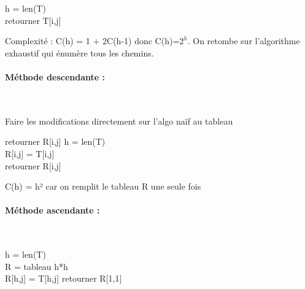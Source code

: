 \begin{algorithm}[H]
	
	h = len(T) \\
	 {
		retourner T[i,j]
	}
	
	\caption{cheminOpt(T, i, j)}
\end{algorithm}

\begin{rem}
	Complexité : C(h) = 1 + 2C(h-1) donc C(h)=$2^{h}$. On retombe sur l'algorithme exhaustif qui énumère tous les chemins.
\end{rem}

\paragraph{Méthode descendante :} \enspace\\

\begin{com}
	Faire les modifications directement sur l'algo naïf au tableau
\end{com}

\begin{algorithm}[H]
	 {
		retourner R[i,j]
	}
	h = len(T) \\
	 {
		R[i,j] = T[i,j] \\
		retourner R[i,j]
	}
	
	\caption{cheminOpt(T, R, i, j)}
\end{algorithm}

\begin{rem}
	C(h) = h² car on remplit le tableau R une seule fois
\end{rem}

\paragraph{Méthode ascendante :} \enspace\\

\begin{algorithm}[H]
	h = len(T) \\
	R = tableau h*h \\
	 {
		R[h,j] = T[h,j]
	}
	retourner R[1,1]
	\caption{cheminOpt(T)}
\end{algorithm}

